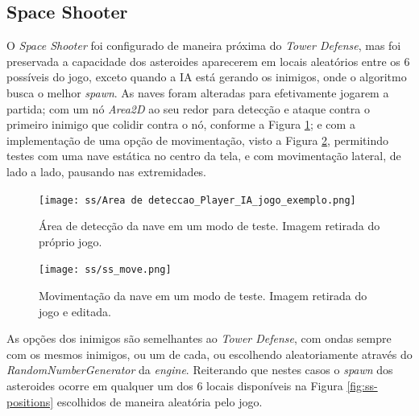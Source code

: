 \newpage
\subsection{Space Shooter}
\label{sec:mt-ss}

O \textit{Space Shooter} foi configurado de maneira próxima do \textit{Tower Defense}, mas foi preservada a capacidade dos asteroides aparecerem em locais aleatórios entre os 6 possíveis do jogo, exceto quando a IA está gerando os inimigos, onde o algoritmo busca o melhor \textit{spawn}. As naves foram alteradas para efetivamente jogarem a partida; com um nó \textit{Area2D} ao seu redor para detecção e ataque contra o primeiro inimigo que colidir contra o nó, conforme a Figura \ref{fig:ss-area}; e com a implementação de uma opção de movimentação, visto a Figura \ref{fig:ss-move}, permitindo testes com uma nave estática no centro da tela, e com movimentação lateral, de lado a lado, pausando nas extremidades.

\begin{figure}
  \centering
  \texttt{[image: ss/Area de deteccao\_Player\_IA\_jogo\_exemplo.png]}
  \caption{Área de detecção da nave em um modo de teste. Imagem retirada do próprio jogo.\label{fig:ss-area}}
\end{figure}

\begin{figure}
  \centering
  \texttt{[image: ss/ss\_move.png]}
  \caption{Movimentação da nave em um modo de teste. Imagem retirada do jogo e editada.\label{fig:ss-move}}
\end{figure}

\pagebreak

As opções dos inimigos são semelhantes ao \textit{Tower Defense}, com ondas sempre com os mesmos inimigos, ou um de cada, ou escolhendo aleatoriamente através do \textit{RandomNumberGenerator} da \textit{engine}. Reiterando que nestes casos o \textit{spawn} dos asteroides ocorre em qualquer um dos 6 locais disponíveis na Figura \ref{fig:ss-positions} escolhidos de maneira aleatória pelo jogo.